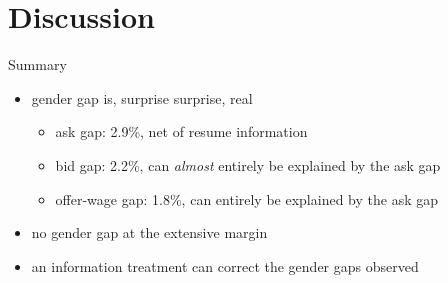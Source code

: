 \section{Discussion}

\frame{\sectionpage}

\begin{frame}{Summary}
    \begin{itemize}
        \item gender gap is, surprise surprise, real 
        \begin{itemize}
            \item ask gap: 2.9\%, net of resume information
            \item bid gap: 2.2\%, can \textit{almost} entirely be explained by the ask gap 
            \item offer-wage gap: 1.8\%, can entirely be explained by the ask gap 
        \end{itemize}
        \item no gender gap at the extensive margin
        \item an information treatment can correct the gender gaps observed
    \end{itemize}
\end{frame}

